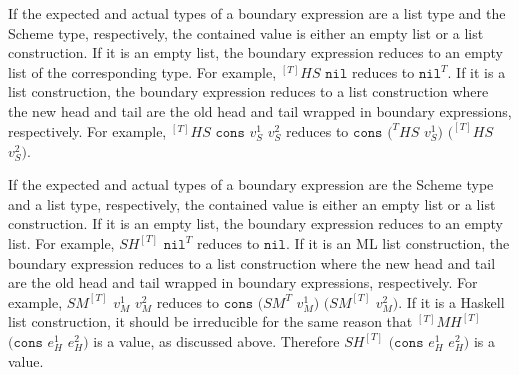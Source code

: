 If the expected and actual types of a boundary expression are a list type and the Scheme type, respectively, the contained value is either an empty list or a list construction.  If it is an empty list, the boundary expression reduces to an empty list of the corresponding type.  For example, $^{[T]}HS$ $\mathtt{nil}$ reduces to $\mathtt{nil}^{T}$.  If it is a list construction, the boundary expression reduces to a list construction where the new head and tail are the old head and tail wrapped in boundary expressions, respectively.  For example, $^{[T]}HS$ $\mathtt{cons}$ $v_{S}^{1}$ $v_{S}^{2}$ reduces to $\mathtt{cons}$ $(^{T}HS$ $v_{S}^{1})$ $(^{[T]}HS$ $v_{S}^{2})$.

If the expected and actual types of a boundary expression are the Scheme type and a list type, respectively, the contained value is either an empty list or a list construction.  If it is an empty list, the boundary expression reduces to an empty list.  For example, $SH^{[T]}$ $\mathtt{nil}^{T}$ reduces to $\mathtt{nil}$.  If it is an ML list construction, the boundary expression reduces to a list construction where the new head and tail are the old head and tail wrapped in boundary expressions, respectively.  For example, $SM^{[T]}$ $v_{M}^{1}$ $v_{M}^{2}$ reduces to $\mathtt{cons}$ $(SM^{T}$ $v_{M}^{1})$ $(SM^{[T]}$ $v_{M}^{2})$.  If it is a Haskell list construction, it should be irreducible for the same reason that $^{[T]}MH^{[T]}$ $(\mathtt{cons}$ $e_{H}^{1}$ $e_{H}^{2})$ is a value, as discussed above.  Therefore $SH^{[T]}$ $(\mathtt{cons}$ $e_{H}^{1}$ $e_{H}^{2})$ is a value.









